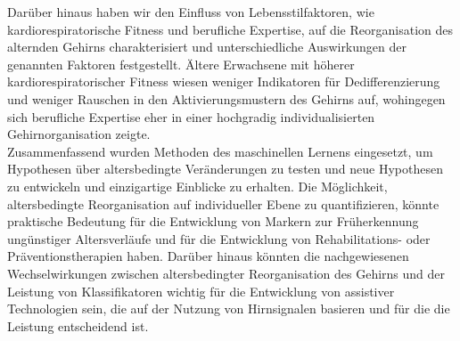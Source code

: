 Darüber hinaus haben wir den Einfluss von Lebensstilfaktoren, wie kardiorespiratorische Fitness und berufliche Expertise, auf die Reorganisation des alternden Gehirns charakterisiert und unterschiedliche Auswirkungen der genannten Faktoren festgestellt. Ältere Erwachsene mit höherer kardiorespiratorischer Fitness wiesen weniger Indikatoren für Dedifferenzierung und weniger Rauschen in den Aktivierungsmustern des Gehirns auf, wohingegen sich berufliche Expertise eher in einer hochgradig individualisierten Gehirnorganisation zeigte.\\
Zusammenfassend wurden Methoden des maschinellen Lernens eingesetzt, um Hypothesen über altersbedingte Veränderungen zu testen und neue Hypothesen zu entwickeln und einzigartige Einblicke zu erhalten. Die Möglichkeit, altersbedingte Reorganisation auf individueller Ebene zu quantifizieren, könnte praktische Bedeutung für die Entwicklung von Markern zur Früherkennung ungünstiger Altersverläufe und für die Entwicklung von Rehabilitations- oder Präventionstherapien haben. Darüber hinaus könnten die nachgewiesenen Wechselwirkungen zwischen altersbedingter Reorganisation des Gehirns und der Leistung von Klassifikatoren wichtig für die Entwicklung von assistiver Technologien sein, die auf der Nutzung von Hirnsignalen basieren und für die die Leistung entscheidend ist.